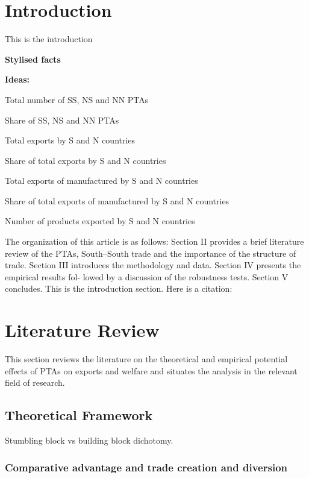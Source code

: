 \documentclass[12pt]{article}%
\begin{document}
%
\newpage%
\listoffigures%
\newpage%
\listoftables%
\newpage%
%
\pagestyle{mainmatter}%
\section{Introduction}%
\label{sec:Introduction}%
This is the introduction

\textbf{Stylised facts}

\textbf{Ideas:}

Total number of SS, NS and NN PTAs

Share of SS, NS and NN PTAs

Total exports by S and N countries

Share of total exports by S and N countries

Total exports of manufactured by S and N countries

Share of total exports of manufactured by S and N countries

Number of products exported by S and N countries

The organization of this article is as follows: Section II provides a
brief literature review of the PTAs, South--South trade and the
importance of the structure of trade. Section III introduces the
methodology and data. Section IV presents the empirical results fol-
lowed by a discussion of the robustness tests. Section V concludes.
%
This is the introduction section. Here is a citation: %
\cite{dahi_preferential_2013}

%
\section{Literature Review}%
\label{sec:LiteratureReview}%
This section reviews the literature on the theoretical and empirical potential effects of PTAs on exports and welfare and situates the analysis in the relevant field of research.%
\subsection{Theoretical Framework}%
\label{subsec:TheoreticalFramework}%
Stumbling block vs building block dichotomy.%
\subsubsection{Comparative advantage and trade creation and diversion}%
\label{ssubsec:Comparativeadvantageandtradecreationanddiversion}%
\end{document}
